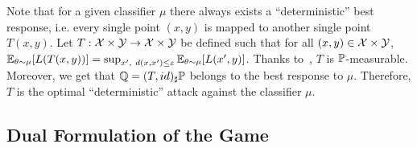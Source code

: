 \begin{rmq}
Note that for a given classifier $\mu$ there always exists a ``deterministic'' best response, i.e. every single point $(x,y)$ is mapped to another single point $T(x,y)$. Let $T:\mathcal{X}\times\mathcal{Y}\to\mathcal{X}\times\mathcal{Y}$ be defined such that for all $(x,y)\in\mathcal{X}\times\mathcal{Y}$, $\EE_{\theta\sim\mu}\left[\loss(T(x,y))\right] = \sup_{x',~d(x,x')\leq\varepsilon}\EE_{\theta\sim\mu}\left[ L(x',y)\right]$. Thanks to~\citep[Proposition 7.50]{bertsekas2004stochastic}, $T$ is $\mathbb{P}$-measurable. Moreover, we get that $\mathbb{Q} = (T,id)_\sharp \mathbb{P}$ belongs to the best response to $\mu$. Therefore, $T$ is the optimal ``deterministic'' attack against the classifier $\mu$.
\end{rmq}




\subsection{Dual Formulation of the Game}

